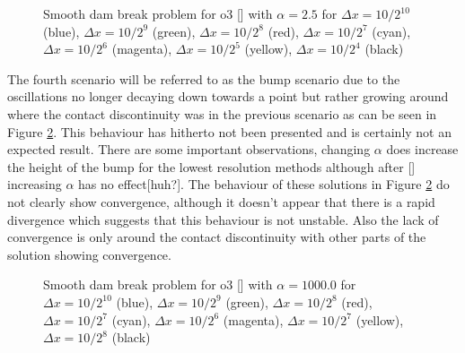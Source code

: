 \documentclass[SingleSpace,12pt,Proceedings]{Serre_ASCE}
\begin{document}
\begin{figure}
\centering
{}
\caption{Smooth dam break problem for o3 [] with $\alpha = 2.5$ for $\Delta x = 10/2^{10}$ (blue), $\Delta x = 10/2^9$ (green), $\Delta x = 10/2^8$ (red), $\Delta x = 10/2^7$ (cyan), $\Delta x = 10/2^6$ (magenta), $\Delta x = 10/2^5$ (yellow), $\Delta x = 10/2^{4}$ (black)}
\label{fig:o3a9dxlimcdexp}
\end{figure}

The fourth scenario will be referred to as the bump scenario due to the oscillations no longer decaying down towards a point but rather growing around where the contact discontinuity was in the previous scenario as can be seen in Figure \ref{fig:o3a20dxlimcdexp}. This behaviour has hitherto not been presented and is certainly not an expected result. There are some important observations, changing $\alpha$ does increase the height of the bump for the lowest resolution methods although after [] increasing $\alpha$ has no effect[huh?]. The behaviour of these solutions in Figure \ref{fig:o3a20dxlimcdexp} do not clearly show convergence, although it doesn't appear that there is a rapid divergence which suggests that this behaviour is not unstable. Also the lack of convergence is only around the contact discontinuity with other parts of the solution showing convergence. 

\begin{figure}
\centering
{}
\caption{Smooth dam break problem for o3 [] with $\alpha = 1000.0$ for $\Delta x = 10/2^{10}$ (blue), $\Delta x = 10/2^9$ (green), $\Delta x = 10/2^8$ (red), $\Delta x = 10/2^7$ (cyan), $\Delta x = 10/2^6$ (magenta), $\Delta x = 10/2^7$ (yellow), $\Delta x = 10/2^{8}$ (black)}
\label{fig:o3a20dxlimcdexp}
\end{figure}
\end{document}
